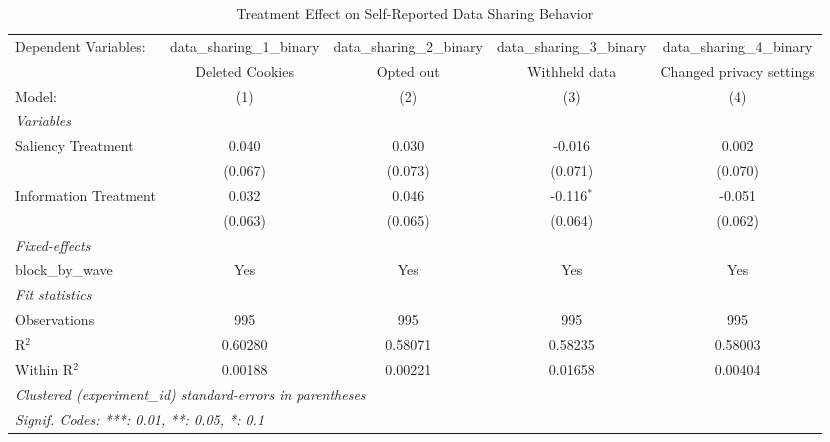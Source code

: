 
\begin{table}[htbp]
   \caption{Treatment Effect on Self-Reported Data Sharing Behavior}
   \centering
   \begin{tabular}{lcccc}
      \tabularnewline \midrule \midrule
      Dependent Variables:  & data\_sharing\_1\_binary    & data\_sharing\_2\_binary    & data\_sharing\_3\_binary    & data\_sharing\_4\_binary\\     
                            & Deleted Cookies             & Opted out                   & Withheld data               & Changed privacy settings \\   
      Model:                & (1)                         & (2)                         & (3)                         & (4)\\  
      \midrule
      \emph{Variables}\\
      Saliency Treatment    & 0.040                       & 0.030                       & -0.016                      & 0.002\\   
                            & (0.067)                     & (0.073)                     & (0.071)                     & (0.070)\\   
      Information Treatment & 0.032                       & 0.046                       & -0.116$^{*}$                & -0.051\\   
                            & (0.063)                     & (0.065)                     & (0.064)                     & (0.062)\\   
      \midrule
      \emph{Fixed-effects}\\
      block\_by\_wave       & Yes                         & Yes                         & Yes                         & Yes\\  
      \midrule
      \emph{Fit statistics}\\
      Observations          & 995                         & 995                         & 995                         & 995\\  
      R$^2$                 & 0.60280                     & 0.58071                     & 0.58235                     & 0.58003\\  
      Within R$^2$          & 0.00188                     & 0.00221                     & 0.01658                     & 0.00404\\  
      \midrule \midrule
      \multicolumn{5}{l}{\emph{Clustered (experiment\_id) standard-errors in parentheses}}\\
      \multicolumn{5}{l}{\emph{Signif. Codes: ***: 0.01, **: 0.05, *: 0.1}}\\
   \end{tabular}
\end{table}


